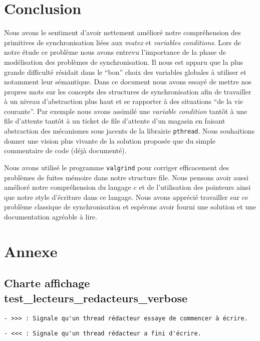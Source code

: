 \documentclass[11pt]{article}
\theoremstyle{definition}
\theoremstyle{definition}
\begin{document}
\section{Conclusion}
Nous avons le sentiment d'avoir nettement amélioré notre compréhension des primitives de synchronisation liées aux \textit{mutex} et \textit{variables conditions}. Lors de notre étude ce problème nous avons entrevu l'importance de la phase de modélisation des problèmes de synchronisation. Il nous est apparu que la plus grande difficulté résidait dans le ``bon'' choix des variables globales à utiliser et notamment leur sémantique. Dans ce document nous avons essayé de mettre nos propres mots sur les concepts des structures de synchronisation afin de travailler à un niveau d'abstraction plus haut et se rapporter à des situations ``de la vie courante''. Par exemple nous avons assimilé une \textit{variable condition} tantôt à une file d'attente tantôt à un ticket de file d'attente d'un magasin en faisant abstraction des mécanismes sous jacents de la librairie \texttt{pthread}. Nous souhaitions donner une vision plus vivante de la solution proposée que du simple commentaire de code (déjà documenté).

Nous avons utilisé le programme \texttt{valgrind} pour corriger efficacement des problèmes de fuites mémoire dans notre structure file. Nous pensons avoir aussi amélioré notre compréhension du langage c et de l'utilisation des pointeurs ainsi que notre style d'écriture dans ce langage.
Nous avons apprécié travailler sur ce problème classique de synchronisation et espérons avoir fourni une solution et une documentation agréable à lire.

\section{Annexe}
\subsection{Charte affichage test\_lecteurs\_redacteurs\_verbose}
\begin{lstlisting}[columns=fixed,basicstyle=\scriptsize\ttfamily]
  - >>> : Signale qu'un thread rédacteur essaye de commencer à écrire.
\end{lstlisting}

\begin{lstlisting}[columns=fixed,basicstyle=\scriptsize\ttfamily]
  - <<< : Signale qu'un thread rédacteur a fini d'écrire.
\end{lstlisting}
\end{document}
